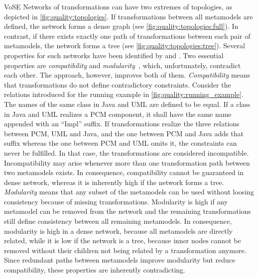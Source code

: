 \begin{copiedFrom}{VoSE}
Networks of transformations can have two extremes of topologies, as depicted in \autoref{fig:quality:topologies}.
If transformations between all metamodels are defined, the network forms a dense graph (see \autoref{fig:quality:topologies:full}).
In contrast, if there exists exactly one path of transformations between each pair of metamodels, the network forms a tree (see \autoref{fig:quality:topologies:tree}).
Several properties for such %
networks have been identified by \textcite{gleitze2017a} and \textcite{klare2018docsym}.
Two essential properties %
are \emph{compatibility} and \emph{modularity}~\cite{klare2018docsym}, which, unfortunately, contradict each other.
The \commonalities approach, however, improves both of them. %
\emph{Compatibility} means that transformations do not define contradictory constraints.
Consider the relations introduced for the running example in \autoref{fig:quality:running_example}.
The names of the same class in Java and UML are defined to be equal.
If a class in Java and UML realizes a \gls{PCM} component, it shall have the same name appended with an \enquote{Impl} suffix.
If transformations realize the three relations between \gls{PCM}, UML and Java, and the one between \gls{PCM} and Java adds that suffix whereas the one between \gls{PCM} and UML omits it, the constraints can never be fulfilled.
In that case, the transformations are considered incompatible.
Incompatibility may arise whenever more than one transformation path between two metamodels exists.
In consequence, compatibility cannot be guaranteed in dense network, whereas it is inherently high if the network forms a tree.
\emph{Modularity} means that any subset of the metamodels can be used without loosing consistency because of missing transformations.
Modularity is high if any metamodel can be removed from the network and the remaining transformations still define consistency between all remaining metamodels.
In consequence, modularity is high in a dense network, because all metamodels are directly related, while it is low if the network is a tree, because inner nodes cannot be removed without their children not being related by a transformation anymore.
Since redundant paths between metamodels improve modularity but reduce compatibility, these properties are inherently contradicting.


\end{copiedFrom}
